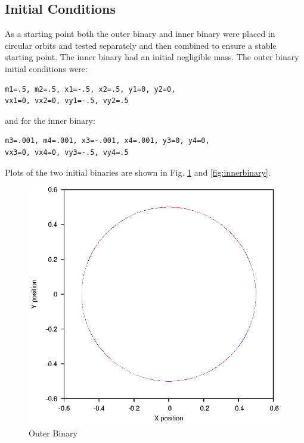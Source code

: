 \documentclass[a4paper,12pt]{article}
\begin{document}
\subsection{Initial Conditions}
As a starting point both the outer binary and inner binary were placed in circular orbits and tested separately and then combined to ensure a stable
starting point. The inner binary had an initial negligible mass.
The outer binary initial conditions were:
\begin{lstlisting}
m1=.5, m2=.5, x1=-.5, x2=.5, y1=0, y2=0,
vx1=0, vx2=0, vy1=-.5, vy2=.5
\end{lstlisting}
and for the inner binary:
\begin{lstlisting}
m3=.001, m4=.001, x3=-.001, x4=.001, y3=0, y4=0, 
vx3=0, vx4=0, vy3=-.5, vy4=.5
\end{lstlisting}
Plots of the two initial binaries are shown in Fig. \ref{fig:outerbinary} and 
\ref{fig:innerbinary}.
\begin{figure}[H]
\centering
\includegraphics[width=.9\textwidth]{./2016results/outerbinary/Orbit.eps}
\caption{Outer Binary}
\label{fig:outerbinary}
\end{figure}
\end{document}
